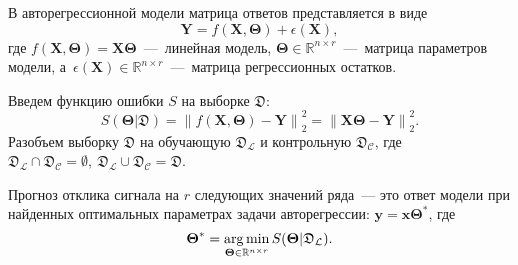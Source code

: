 \documentclass[12pt,twoside]{article}
\newcommand{\bTheta}{\boldsymbol{\Theta}}
\begin{document}
В авторегрессионной модели матрица ответов представляется в виде 
$$\mathbf{Y} = f (\mathbf{X},  \bTheta) + \epsilon ( \mathbf{X} ), $$ 
где  $f (\mathbf{X},  \bTheta) = \mathbf{X} \bTheta$~---~линейная модель, $\bTheta \in \mathbb{R}^{n \times r}$~---~матрица параметров модели, а~$\epsilon(\mathbf{X})\in \mathbb{R}^{n \times r}$~---~матрица регрессионных остатков.


Введем  функцию ошибки $S$ на выборке $\mathfrak{D}$:
$$S(\bTheta | \mathfrak{D}) = {\bigl\| f(\mathbf{X},  \bTheta) - \mathbf{Y} \bigr\| }_2^2 =  {\bigl\| \mathbf{X}\bTheta - \mathbf{Y} \bigr\| }_2^2.$$
Разобъем выборку $\mathfrak{D}$ на обучающую $\mathfrak{D}_{\mathcal{L}}$ и контрольную $\mathfrak{D}_{\mathcal{C}}$, где $\mathfrak{D}_{\mathcal{L}} \cap \mathfrak{D}_{\mathcal{C}} = \emptyset,\ \mathfrak{D}_{\mathcal{L}} \cup \mathfrak{D}_{\mathcal{C}} = \mathfrak{D}$.



Прогноз отклика сигнала на $r$ следующих значений ряда~--- это ответ модели при найденных оптимальных параметрах задачи авторегрессии: $\mathbf{y} = \mathbf{x}\bTheta^*$, где 
$$ {\bTheta}^{*} = \argmin_{\bTheta \in \mathbb{R}^{n \times r}} S(\bTheta | \mathfrak{D}_\mathcal{L}).$$
 

\end{document}
